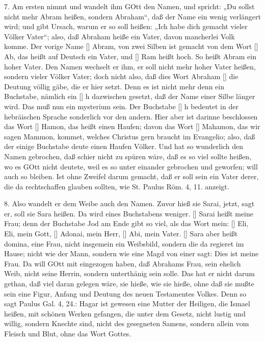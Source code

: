 7. Am ersten nimmt und wandelt ihm GOtt den Namen, und spricht: „Du sollst nicht mehr Abram heißen, sondern Abraham“, daß der Name ein wenig verlängert wird; und gibt Ursach, warum er so soll heißen: „Ich habe dich gemacht vieler Völker Vater“; also, daß Abraham heiße ein Vater, davon mancherlei Volk komme. Der vorige Name [] Abram, von zwei Silben ist gemacht von dem Wort [] Ab, das heißt auf Deutsch ein Vater, und [] Ram heißt hoch. So heißt Abram ein hoher Vater. Den Namen wechselt er ihm, er soll nicht mehr hoher Vater heißen, sondern vieler Völker Vater; doch nicht also, daß dies Wort Abraham [] die Deutung völlig gäbe, die er hier setzt. Denn es ist nicht mehr denn ein Buchstabe, nämlich ein [] h dazwischen gesetzt, daß der Name einer Silbe länger wird. Das muß nun ein mysterium sein. Der Buchstabe [] h bedeutet in der
hebräischen Sprache sonderlich vor den andern. Hier aber ist darinne beschlossen das Wort [] Hamon, das heißt einen Haufen; davon das Wort [] Mahamon, das wir sagen Mammon, kommet, welches Christus gern braucht im Evangelio; also, daß der einige Buchstabe deute einen Haufen Völker. Und hat so wunderlich den Namen gebrochen, daß schier nicht zu spüren wäre, daß es so viel sollte heißen, wo es GOtt nicht deutete, weil es so unter einander gebrochen und geworfen; will auch so bleiben. Ist ohne Zweifel darum gemacht, daß er soll sein ein Vater derer, die da rechtschaffen glauben sollten, wie St. Paulus Röm. 4, 11. anzeigt.

8. Also wandelt er dem Weibe auch den Namen. Zuvor hieß sie Sarai, jetzt, sagt er, soll sie Sara heißen. Da wird eines Buchstabens weniger. [] Sarai heißt meine Frau; denn der Buchstabe Jod am Ende gibt so viel, als das Wort mein: [] Eli, Eli, mein Gott, [] Adonai, mein Herr, [] Abi, mein Vater. [] Sara aber heißt domina, eine Frau, nicht insgemein ein Weibsbild, sondern die da regieret im Hause; nicht wie der Mann, sondern wie eine Magd von einer sagt: Dies ist meine Frau. Da will GOtt mit eingezogen haben, daß Abrahams Frau, sein ehelich Weib, nicht seine Herrin, sondern unterthänig sein solle. Das hat er nicht darum gethan, daß viel daran gelegen wäre, sie hieße, wie sie hieße, ohne daß sie mußte sein eine Figur, Anfang und Deutung des neuen Testamentes Volkes. Denn so sagt Paulus Gal. 4, 24.: Hagar ist gewesen eine Mutter der Heiligen, die Ismael heißen, mit schönen Werken gefangen, die unter dem Gesetz, nicht lustig und willig, sondern Knechte sind, nicht des gesegneten Samens, sondern allein vom Fleisch und Blut, ohne das Wort Gottes.

